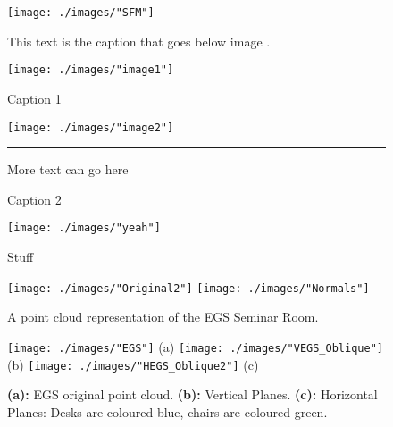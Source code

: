 \begin{figure}[ht!] %
	\centering
	\texttt{[image: ./images/"SFM"]}
	\caption[This bit is seen on list of figures page]{This text is the caption that goes below image \citep{fergus_lecture_2012}.
		\label{labelGoesHereInsideBracket}}
\end{figure}

\begin{figure}[!h]
	\centering
	\begin{minipage}{.45\linewidth}%
		\texttt{[image: ./images/"image1"]}
		\caption[image1]{Caption 1}
		\label{image1}
	\end{minipage}
	\hspace{.05\linewidth}%
	\begin{minipage}{.45\linewidth}
		\texttt{[image: ./images/"image2"]}
		\caption[image2]{Caption 2}
		\label{image2}
	\end{minipage}
	\rule[0.5em]{38em}{0.5pt}%
	More text can go here
\end{figure}

\begin{figure}[ht!]
	\centering
	\texttt{[image: ./images/"yeah"]}
	\caption[blahblah]{Stuff
		\label{label}}
\end{figure}

\begin{sidewaysfigure}[h!]
	\centering
	\texttt{[image: ./images/"Original2"]}
	\texttt{[image: ./images/"Normals"]}
	\caption{A point cloud representation of the EGS Seminar Room.\label{EGS}}
\end{sidewaysfigure}

\begin{figure}[h!]
	\centering
	\texttt{[image: ./images/"EGS"]}
	(a)
	\texttt{[image: ./images/"VEGS\_Oblique"]}
	(b)
	\texttt{[image: ./images/"HEGS\_Oblique2"]}
	(c)
	\caption[Results of the plane segmentation for the EGS Seminar Room]{\textbf{(a):} EGS original point cloud. \textbf{(b):} Vertical Planes. \textbf{(c):} Horizontal Planes: Desks are coloured blue, chairs are coloured green.\label{FinalEGS}}
\end{figure}